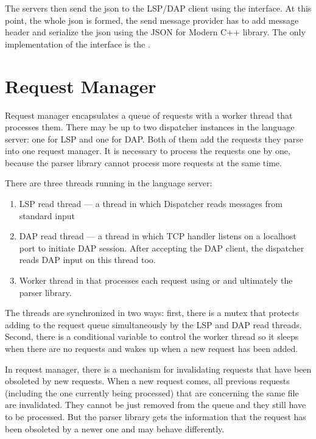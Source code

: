 The servers then send the json to the LSP/DAP client using the  interface. At this point, the whole json is formed, the send message provider has to add message header and serialize the json using the JSON for Modern C++ library. The only implementation of the  interface is the .

\section{Request Manager}

Request manager encapsulates a queue of requests with a worker thread that processes them. There may be up to two dispatcher instances in the language server: one for LSP and one for DAP. Both of them add the requests they parse into one request manager. It is necessary to process the requests one by one, because the parser library cannot process more requests at the same time.

There are three threads running in the language server:
\begin{enumerate}
	\item LSP read thread --- a thread in which Dispatcher reads messages from standard input
	\item DAP read thread --- a thread in which TCP handler listens on a localhost port to initiate DAP session. After accepting the DAP client, the dispatcher reads DAP input on this thread too.
	\item Worker thread in that processes each request using  or  and ultimately the parser library.
\end{enumerate}

The threads are synchronized in two ways: first, there is a mutex that protects adding to the request queue simultaneously by the LSP and DAP read threads. Second, there is a conditional variable to control the worker thread so it sleeps when there are no requests and wakes up when a new request has been added.

In request manager, there is a mechanism for invalidating requests that have been obsoleted by new requests. When a new request comes, all previous requests (including the one currently being processed) that are concerning the same file are invalidated. They cannot be just removed from the queue and they still have to be processed. But the parser library gets the information that the request has been obsoleted by a newer one and may behave differently.

